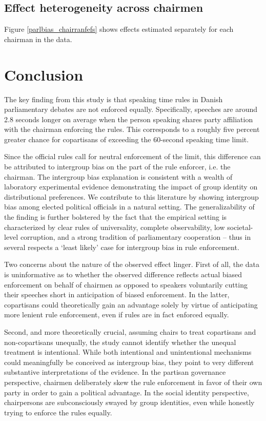 \documentclass[12pt,a4paper]{article}
\begin{document}
\subsection{Effect heterogeneity across chairmen}

Figure \ref{parlbias_chairranfefs} shows effects estimated separately for each chairman in the data.


\section{Conclusion}\label{conc}

\noindent The key finding from this study is that speaking time rules in Danish parliamentary debates are not enforced equally. Specifically, speeches are around 2.8 seconds longer on average when the person speaking shares party affiliation with the chairman enforcing the rules. This corresponds to a roughly five percent greater chance for copartisans of exceeding the 60-second speaking time limit.

Since the official rules call for neutral enforcement of the limit, this difference can be attributed to intergroup bias on the part of the rule enforcer, i.e. the chairman. The intergroup bias explanation is consistent with a wealth of laboratory experimental evidence demonstrating the impact of group identity on distributional preferences. We contribute to this literature by showing intergroup bias among elected political officials in a natural setting. The generalizability of the finding is further bolstered by the fact that the empirical setting is characterized by clear rules of universality, complete observability, low societal-level corruption, and a strong tradition of parliamentary cooperation -- thus in several respects a `least likely' case for intergroup bias in rule enforcement.

Two concerns about the nature of the observed effect linger. First of all, the data is uninformative as to whether the observed difference reflects actual biased enforcement on behalf of chairmen as opposed to speakers voluntarily cutting their speeches short in anticipation of biased enforcement. In the latter, copartisans could theoretically gain an advantage solely by virtue of anticipating more lenient rule enforcement, even if rules are in fact enforced equally.

Second, and more theoretically crucial, assuming chairs to treat copartisans and non-copartisans unequally, the study cannot identify whether the unequal treatment is intentional. While both intentional and unintentional mechanisms could meaningfully be conceived as intergroup bias, they point to very different substantive interpretations of the evidence. In the partisan governance perspective, chairmen deliberately skew the rule enforcement in favor of their own party in order to gain a political advantage. In the social identity perspective, chairpersons are subconsciously swayed by group identities, even while honestly trying to enforce the rules equally.
\end{document}
